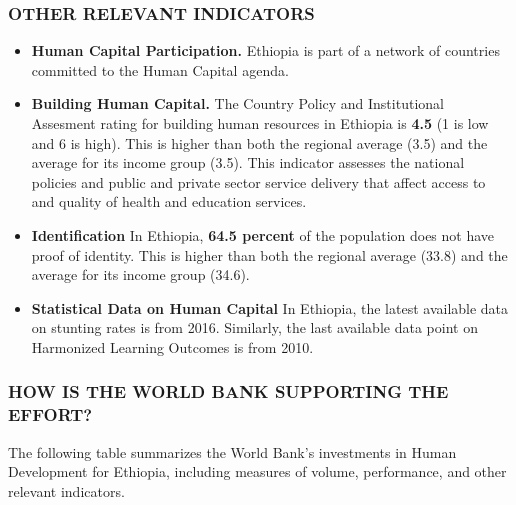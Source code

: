 \documentclass[9.2pt,twocolumn]{article}
\begin{document}
\hypertarget{section-3}{%
\subsubsection{\texorpdfstring{\textcolor{bondiblue}{\textbf{O\small{THER RELEVANT INDICATORS }}}}{}}\label{section-3}}

\begin{itemize}
\item
  \textbf{Human Capital Participation.} Ethiopia is part of a network of
  countries committed to the Human Capital agenda.
\item
  \textbf{Building Human Capital.} The Country Policy and Institutional
  Assesment rating for building human resources in Ethiopia is
  \textbf{4.5} (1 is low and 6 is high). This is higher than both the
  regional average (3.5) and the average for its income group (3.5).
  This indicator assesses the national policies and public and private
  sector service delivery that affect access to and quality of health
  and education services.
\item
  \textbf{Identification} In Ethiopia, \textbf{64.5 percent} of the
  population does not have proof of identity. This is higher than both
  the regional average (33.8) and the average for its income group
  (34.6).
\item
  \textbf{Statistical Data on Human Capital} In Ethiopia, the latest
  available data on stunting rates is from 2016. Similarly, the last
  available data point on Harmonized Learning Outcomes is from 2010.
\end{itemize}

\hypertarget{section-4}{%
\subsubsection{\texorpdfstring{\textcolor{bondiblue}{\textbf{H\small{OW IS THE WORLD BANK SUPPORTING THE EFFORT?}}}}{}}\label{section-4}}

The following table summarizes the World Bank's investments in Human
Development for Ethiopia, including measures of volume, performance, and
other relevant indicators.
\end{document}
